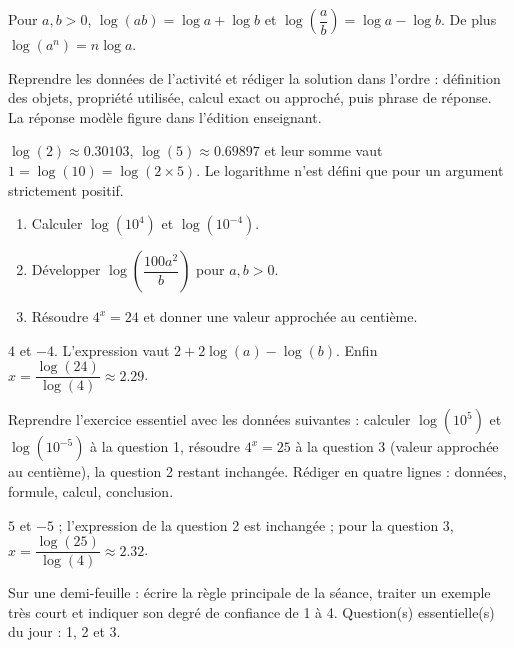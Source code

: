 \begin{summary}Pour $a,b>0$, $\log(ab)=\log a+\log b$ et $\log\!\left(\dfrac ab\right)=\log a-\log b$. De plus $\log(a^n)=n\log a$.\end{summary}

\begin{example}
Reprendre les données de l'activité et rédiger la solution dans l'ordre : définition des objets, propriété utilisée, calcul exact ou approché, puis phrase de réponse. La réponse modèle figure dans l'édition enseignant.
\end{example}
\begin{solution}$\log(2)\approx\num{0,30103}$, $\log(5)\approx\num{0,69897}$ et leur somme vaut $1=\log(10)=\log(2\times5)$. Le logarithme n'est défini que pour un argument strictement positif.\end{solution}

\begin{exercise}[essentiel]
\begin{enumerate}\item Calculer $\log(10^4)$ et $\log(10^{-4})$.\item Développer $\log\!\left(\dfrac{100a^2}{b}\right)$ pour $a,b>0$.\item Résoudre $4^x=24$ et donner une valeur approchée au centième.\end{enumerate}
\end{exercise}
\begin{solution}$4$ et $-4$. L'expression vaut $2+2\log(a)-\log(b)$. Enfin $x=\dfrac{\log(24)}{\log(4)}\approx\num{2,29}$.\end{solution}


\begin{homework}Reprendre l'exercice essentiel avec les données suivantes : calculer $\log(10^{5})$ et $\log(10^{-5})$ à la question 1, résoudre $4^x=25$ à la question 3 (valeur approchée au centième), la question 2 restant inchangée. Rédiger en quatre lignes : données, formule, calcul, conclusion.\end{homework}
\begin{solution}$5$ et $-5$ ; l'expression de la question 2 est inchangée ; pour la question 3, $x=\dfrac{\log(25)}{\log(4)}\approx\num{2,32}$.\end{solution}

\begin{exitticket}[3 minutes]Sur une demi-feuille : écrire la règle principale de la séance, traiter un exemple très court et indiquer son degré de confiance de 1 à 4. Question(s) essentielle(s) du jour : 1, 2 et 3.\end{exitticket}

